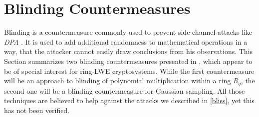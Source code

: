 %
%

\chapter{Blinding Countermeasures}
Blinding is a countermeasure commonly used to prevent side-channel attacks like \textit{\ac{DPA}} \cite{DBLP:conf/crypto/KocherJJ99}. It is used to add additional randomness to mathematical operations in a way, that the attacker cannot easily draw conclusions from his observations. This Section summarizes two blinding countermeasures presented in \cite{cryptoeprint:2016:276}, which appear to be of special interest for \ac{ring-LWE} cryptosystems. While the first countermeasure will be an approach to blinding of polynomial multiplication within a ring \(R_q\), the second one will be a blinding countermeasure for Gaussian sampling. All those techniques are believed to help against the attacks we described in \ref{bliss}, yet this has not been verified.

